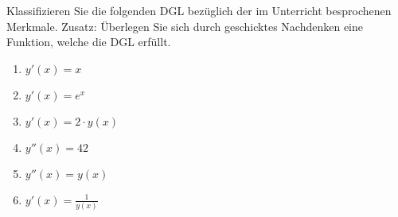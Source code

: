 \item Klassifizieren Sie die folgenden DGL bezüglich der im Unterricht besprochenen Merkmale. Zusatz: Überlegen Sie sich durch geschicktes Nachdenken eine Funktion, welche die DGL erfüllt.

\begin{multicols}{2}
\begin{enumerate}
\item $y'(x) = x$
\item $y'(x) =  e^x$
\item $y'(x)= 2\cdot y(x)$
\item $y''(x) = 42$
\item $ y''(x) = y(x)$
\item $y'(x) = \frac{1}{y(x)}$
\end{enumerate}
\end{multicols}

